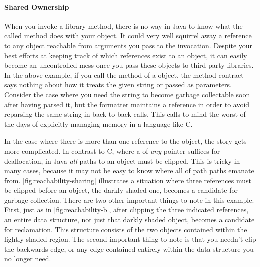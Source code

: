 \paragraph{Shared Ownership}
\label{sec:shared-ownership}

When you invoke a library method, there is no way in Java to know what the called
method does with your object. It could very well squirrel away a reference to any
object reachable from arguments you pass to the invocation. Despite your best
efforts at keeping track of which references exist to an object, it can easily
become an uncontrolled mess once you pass these objects to third-party libraries.
In the above example, if you call the  method of a
 object, the method contract says nothing about how it
treats the given string or  passed as parameters. 
Consider the case where you need the string to become garbage collectable soon
after having parsed it, but the formatter maintains a reference in order to avoid
reparsing the same string in back to back calls. This calls
to mind the worst of the days of explicitly managing memory in a language like C.

In the case where there is more than one reference to the object, the story gets
more complicated. In contrast to C, where a  of \emph{any} pointer
suffices for deallocation, in Java \emph{all} paths to an object must be
clipped. This is tricky in many cases, because it may not
be easy to know where all of path paths emanate from.
\autoref{fig:reachability-sharing} illustrates a situation where three references
must be clipped before an object, the darkly shaded one, becomes a candidate for
garbage collection. There are two other important things to note in this example.
First, just as in \autoref{fig:reachability-b}, after clipping the three
indicated references, an entire data structure, not just that darkly shaded
object, becomes a candidate for reclamation. This structure consists of the two
objects contained within the lightly shaded region. The second important thing to
note is that you needn't clip the backwards edge, or any edge contained entirely
within the data structure you no longer need.


